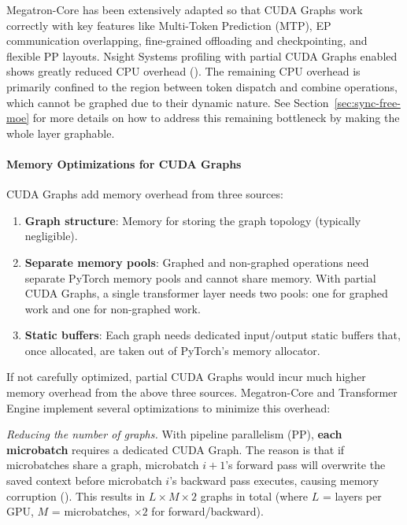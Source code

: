 Megatron-Core has been extensively adapted so that CUDA Graphs work correctly with key features like Multi-Token Prediction (MTP), EP communication overlapping, fine-grained offloading and checkpointing, and flexible PP layouts. Nsight Systems profiling with partial CUDA Graphs enabled shows greatly reduced CPU overhead (). The remaining CPU overhead is primarily confined to the region between token dispatch and combine operations, which cannot be graphed due to their dynamic nature. See Section~\ref{sec:sync-free-moe} for more details on how to address this remaining bottleneck by making the whole layer graphable.

\paragraph{Memory Optimizations for CUDA Graphs}

CUDA Graphs add memory overhead from three sources:

\begin{enumerate}
    \item \textbf{Graph structure}: Memory for storing the graph topology (typically negligible).
    \item \textbf{Separate memory pools}: Graphed and non-graphed operations need separate PyTorch memory pools and cannot share memory. With partial CUDA Graphs, a single transformer layer needs two pools: one for graphed work and one for non-graphed work.
    \item \textbf{Static buffers}: Each graph needs dedicated input/output static buffers that, once allocated, are taken out of PyTorch's memory allocator.
\end{enumerate}

If not carefully optimized, partial CUDA Graphs would incur much higher memory overhead from the above three sources. Megatron-Core and Transformer Engine implement several optimizations to minimize this overhead:

\textit{Reducing the number of graphs.}
With pipeline parallelism (PP), \textbf{each microbatch} requires a dedicated CUDA Graph. The reason is that if microbatches share a graph, microbatch $i+1$'s forward pass will overwrite the saved context before microbatch $i$'s backward pass executes, causing memory corruption (). This results in $L \times M \times 2$ graphs in total (where $L$ = layers per GPU, $M$ = microbatches, $\times 2$ for forward/backward).

